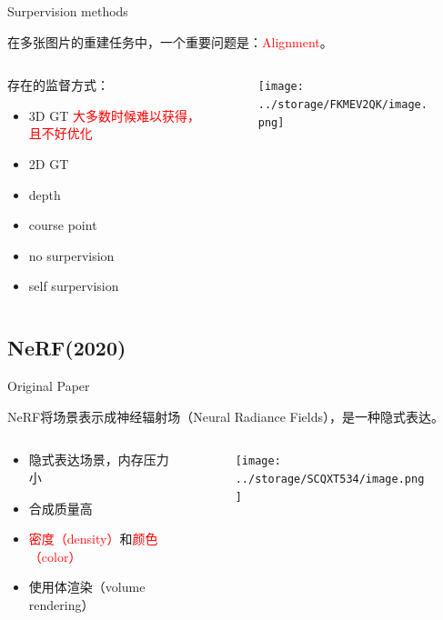 \documentclass[dark]{sintefbeamer}
\begin{document}
\begin{frame}[fragile]{Surpervision methods}

在多张图片的重建任务中，一个重要问题是：\textcolor{red}{Alignment}。

\begin{columns}
  \begin{column}{0.3\textwidth}
    存在的监督方式：
    \begin{itemize}
      \item 3D GT \quad \textcolor{red}{大多数时候难以获得，且不好优化}
      \item 2D GT
      \item depth
      \item course point
      \item no surpervision \cite{elbananiNovelObjectViewpoint2020}
      \item self surpervision
    \end{itemize}
  \end{column}

  \begin{column}{0.7\textwidth}
    \begin{figure}
      \texttt{[image: ../storage/FKMEV2QK/image.png]}
    \end{figure}
  \end{column}
\end{columns}

\end{frame}

\subsection{NeRF(2020)}

\begin{frame}[fragile]{Original Paper}
  
NeRF\cite{mildenhallNeRFRepresentingScenes2020}将场景表示成神经辐射场（Neural Radiance Fields），是一种隐式表达。

\begin{columns}
  \begin{column}{0.3\textwidth}
    \begin{itemize}
      \item 隐式表达场景，内存压力小
      \item 合成质量高
      \item \textcolor{red}{密度（density）}和\textcolor{red}{颜色（color）}
      \item 使用体渲染（volume rendering）
    \end{itemize}
  \end{column}

  \begin{column}{0.7\textwidth}
    \begin{figure}
      \texttt{[image: ../storage/SCQXT534/image.png]}
    \end{figure}
  \end{column}
\end{columns}

\end{frame}
\end{document}

